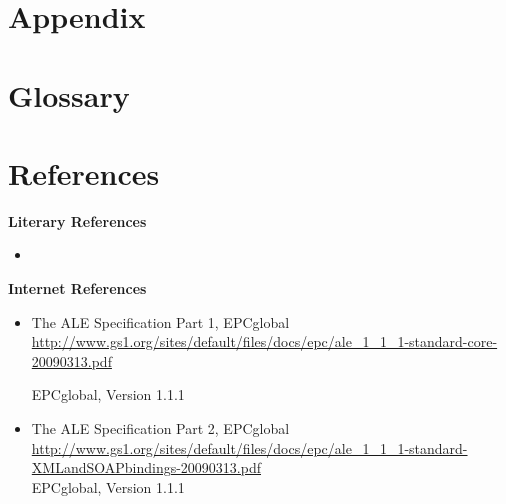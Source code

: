 \documentclass[11pt,a4paper,oneside]{article}
\begin{document}
\section {Appendix}

\section {Glossary}
\section {References}
\textbf {Literary References}

\begin{itemize}
\renewcommand\labelitemi{--}
\item	
\end{itemize}
\textbf {Internet References}
\begin{itemize}
\renewcommand\labelitemi{--}
\sloppy
\item	The ALE Specification Part 1, EPCglobal\\
\url{http://www.gs1.org/sites/default/files/docs/epc/ale_1_1_1-standard-core-20090313.pdf}

EPCglobal, Version 1.1.1
\item  The ALE Specification Part 2, EPCglobal\\
\url{http://www.gs1.org/sites/default/files/docs/epc/ale_1_1_1-standard-XMLandSOAPbindings-20090313.pdf}\\
EPCglobal, Version 1.1.1
\end{itemize}
\end{document}
